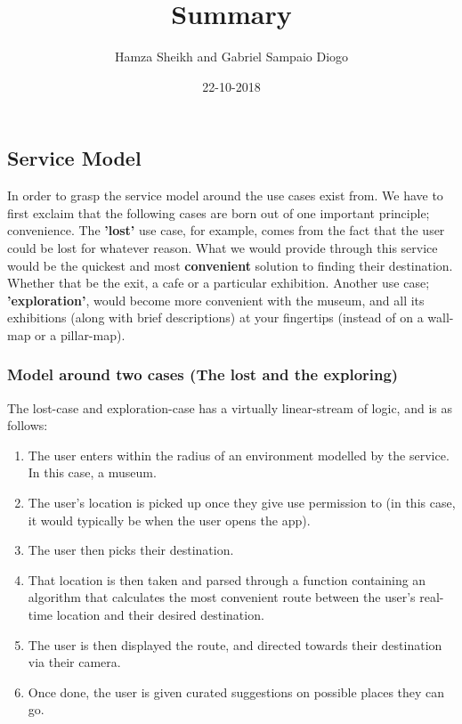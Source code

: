 \documentclass{article}
\title{Summary}
\author{Hamza Sheikh and Gabriel Sampaio Diogo}
\date{22-10-2018}
\begin{document}
\maketitle

\subsection*{Service Model}
In order to grasp the service model around the use cases exist from. We have to first exclaim that the following cases are born out of one important principle; convenience. The \textbf{'lost'} use case, for example, comes from the fact that the user could be lost for whatever reason. What we would provide through this service would be the quickest and most \textbf{convenient} solution to finding their destination. Whether that be the exit, a cafe or a particular exhibition. Another use case;
\textbf{'exploration'}, would become more convenient with the museum, and all its exhibitions (along with brief descriptions) at your fingertips (instead of on a wall-map or a pillar-map).
\subsubsection*{Model around two cases (The lost and the exploring) }
The lost-case and exploration-case has a virtually linear-stream of logic, and is as follows:
\begin{enumerate}
    \item The user enters within the radius of an environment modelled by the service. In this case, a museum.
    \item The user’s location is picked up once they give use permission to (in this case, it would typically be when the user opens the app). 
    \item The user then picks their destination.
    \item That location is then taken and parsed through a function containing an algorithm that calculates the most convenient route between the user’s real-time location and their desired destination.
    \item The user is then displayed the route, and directed towards their destination via their camera.
    \item Once done, the user is given curated suggestions on possible places they can go.
\end{enumerate}
\end{document}
